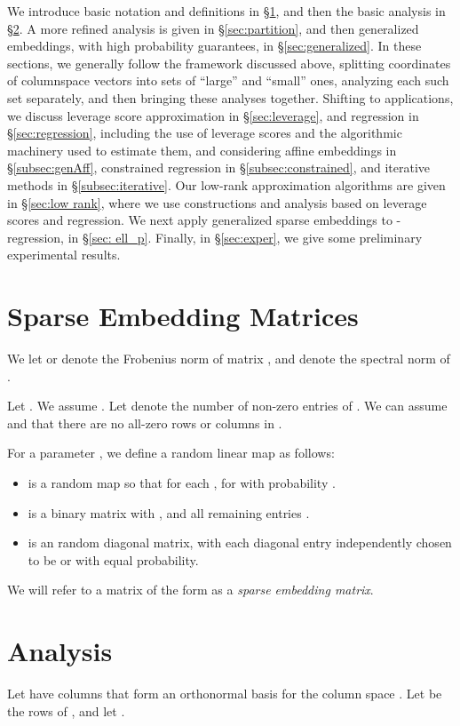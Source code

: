 \documentclass{sig-alternate}
\begin{document}
We introduce basic notation and definitions in \S\ref{sec:sparse embed}, and then the basic 
analysis in \S\ref{sec:analysis}. A more refined analysis is given in \S\ref{sec:partition}, and then
generalized embeddings, with high probability guarantees, in \S\ref{sec:generalized}.
In these sections, we generally follow the framework discussed above, splitting coordinates
of columnspace vectors into sets of ``large'' and ``small'' ones, analyzing each such set 
separately, and then bringing these analyses together.
Shifting to applications, we discuss leverage score approximation in
\S\ref{sec:leverage}, and regression in \S\ref{sec:regression}, including the use of leverage
scores and the algorithmic machinery used to estimate them, and considering
affine embeddings in \S\ref{subsec:genAff}, constrained regression in \S\ref{subsec:constrained},  and iterative methods 
in \S\ref{subsec:iterative}.
Our low-rank approximation algorithms are given in \S\ref{sec:low rank},
where we use constructions and analysis based on leverage
scores and regression.
We next apply generalized sparse embeddings to -regression, in \S\ref{sec: ell_p}.
\ifSTOC
\else
Finally, in \S\ref{sec:exper}, we give some preliminary experimental results.
\fi




\section{Sparse Embedding Matrices}\label{sec:sparse embed}

We let  or  denote the Frobenius norm of matrix ,
and  denote the spectral norm of .

Let . We assume . 
Let  denote the number of non-zero entries of . We can assume
 and that there are no all-zero rows or columns in . 

For a parameter ,
we define a random linear map  as follows:
\begin{itemize}
\item  is a random map so that for each ,  for  with
probability .
\item  is a  binary 
matrix with , and all remaining entries .
\item  is an  random diagonal matrix, with each diagonal
entry independently chosen to be  or  with equal probability.
\end{itemize} 
We will refer to a matrix of the form  as a {\it sparse embedding matrix}.

\section{Analysis}\label{sec:analysis}
Let  have columns that form an
orthonormal basis for the column space . Let  be the rows
of , and let .
\end{document}

